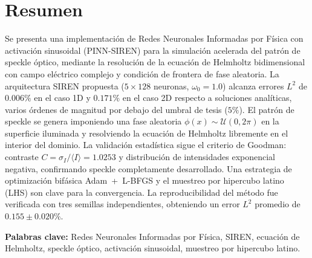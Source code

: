 
\chapter*{Resumen}

\vspace*{-8mm}

Se presenta una implementación de Redes Neuronales Informadas por Física con
activación sinusoidal (PINN-SIREN) para la simulación acelerada del patrón de
speckle óptico, mediante la resolución de la ecuación de Helmholtz bidimensional
con campo eléctrico complejo y condición de frontera de fase aleatoria.
La arquitectura SIREN propuesta ($5 \times 128$ neuronas, $\omega_0 = 1.0$)
alcanza errores $L^2$ de $0.006\%$ en el caso 1D y $0.171\%$ en el caso 2D
respecto a soluciones analíticas, varios órdenes de magnitud por debajo del
umbral de tesis ($5\%$).
El patrón de speckle se genera imponiendo una fase aleatoria
$\phi(x) \sim \mathcal{U}(0, 2\pi)$ en la superficie iluminada y resolviendo la
ecuación de Helmholtz libremente en el interior del dominio.
La validación estadística sigue el criterio de Goodman: contraste
$C = \sigma_I / \langle I \rangle = 1.0253$ y distribución de intensidades
exponencial negativa, confirmando speckle completamente desarrollado.
Una estrategia de optimización bifásica Adam~+~L-BFGS y el muestreo por
hipercubo latino (LHS) son clave para la convergencia.
La reproducibilidad del método fue verificada con tres semillas independientes,
obteniendo un error $L^2$ promedio de $0.155 \pm 0.020\%$.

\bigskip

\noindent\textbf{Palabras clave:} Redes Neuronales Informadas por Física,
SIREN, ecuación de Helmholtz, speckle óptico, activación sinusoidal,
muestreo por hipercubo latino.
